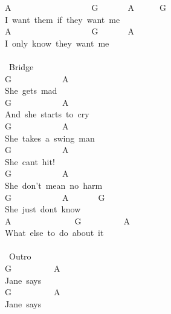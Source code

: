 {A\ \ \ \ \ \ \ \ \ \ \ \ \ \ \ \ \ \ \ G\ \ \ \ \ \ \ A\ \ \ \ \ \ G\\
I\ want\ them\ if\ they\ want\ me\\
A\ \ \ \ \ \ \ \ \ \ \ \ \ \ \ \ \ \ \ G\ \ \ \ \ \ \ A\\
I\ only\ know\ they\ want\ me\\
\\
\lbrack\ Bridge\rbrack\\
G\ \ \ \ \ \ \ \ \ \ \ \ A\\
She\ gets\ mad\\
G\ \ \ \ \ \ \ \ \ \ \ \ A\\
And\ she\ starts\ to\ cry\\
G\ \ \ \ \ \ \ \ \ \ \ \ A\\
She\ takes\ a\ swing\ man\\
G\ \ \ \ \ \ \ \ \ \ \ \ A\\
She\ cant\ hit!\\
G\ \ \ \ \ \ \ \ \ \ \ \ A\\
She\ don't\ mean\ no\ harm\\
G\ \ \ \ \ \ \ \ \ \ \ \ A\ \ \ \ \ \ \ G\\
She\ just\ dont\ know\\
A\ \ \ \ \ \ \ \ \ \ \ \ \ \ \ G\ \ \ \ \ \ \ \ \ \ A\\
What\ else\ to\ do\ about\ it\\
\\
\lbrack\ Outro\rbrack\\
G\ \ \ \ \ \ \ \ \ \ A\\
Jane\ says\\
G\ \ \ \ \ \ \ \ \ \ A\\
Jane\ says}
